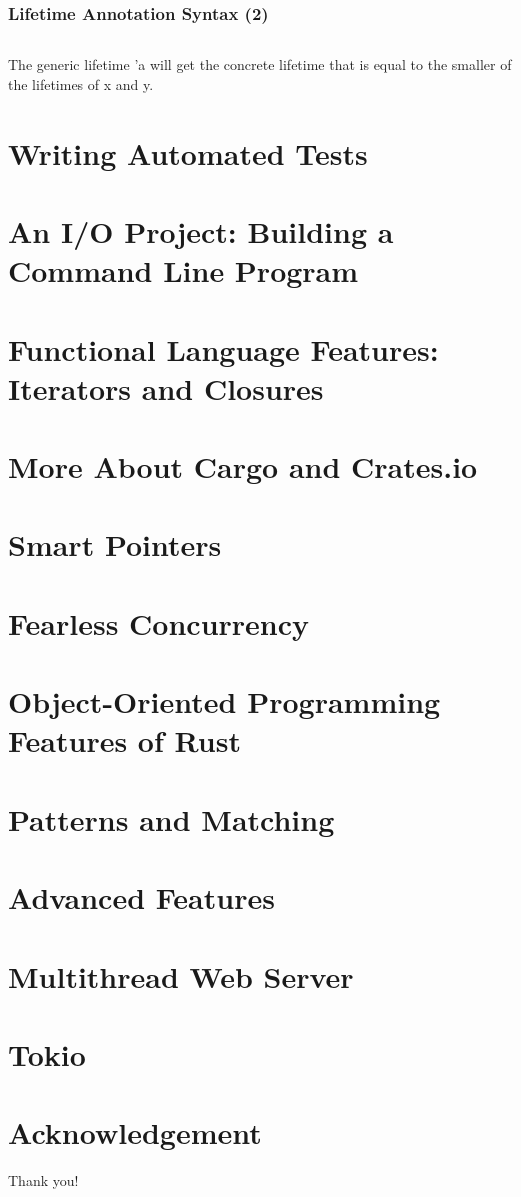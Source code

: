 \documentclass{beamer}
\begin{document}
\begin{frame}[fragile]
	\frametitle{Lifetime Annotation Syntax (2)}
	\inputminted{rust}{./code/lifetime4.rs}
	
	 The generic lifetime 'a will get the concrete lifetime that is equal to the smaller of the lifetimes of x and y.
\end{frame}


 
\section{Writing Automated Tests}
\section{An I/O Project: Building a Command Line Program}
\section{Functional Language Features: Iterators and Closures}
\section{More About Cargo and Crates.io}
\section{Smart Pointers}
\section{Fearless Concurrency}
\section{Object-Oriented Programming Features of Rust}
\section{Patterns and Matching}
\section{Advanced Features}
\section{Multithread Web Server}
\section{Tokio}

\section*{Acknowledgement}
\begin{frame}
	\Huge{\centerline{Thank you!}}
\end{frame}
\end{document}
